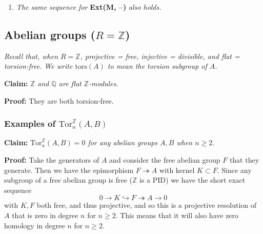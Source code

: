 \documentclass[10pt]{article}
\DeclareMathOperator{\Hom}{Hom}
\begin{document}
\begin{enumerate}
\begin{equation*}
\begin{tikzcd}
{                                              -- (\tikztotarget)}]{u}\\
                            \Hom(A,N) \ar[rounded corners,
                                    to path={ -- ([xshift=-2ex]\tikztostart.west)
                                              -| ([xshift=-2ex]\tikztotarget.west)
                                              -- (\tikztotarget)}]{u}
                            & \Hom(B,N) \lar
                            & \Hom(C,N) \lar
                        \end{tikzcd}
                        \raisebox{-2.25cm}{\hspace{-.4cm}$\xleftarrow{\makebox[1cm]{}}0$}
                    \end{equation*}
                    \item \emph{The same sequence for} \textbf{Ext(M, --)} \emph{also holds.}
            \end{enumerate}
            
        \subsection{Abelian groups ($R=\mathbb{Z}$)}

            \emph{Recall that, when $R=\mathbb{Z}$, projective = free, injective =
            divisible, and flat = torsion-free.} \emph{We write $\mathrm{tors}(A)$
            to mean the torsion subgroup of $A$.}

            \bigskip

            \textbf{Claim:} \emph{$\mathbb{Z}$ and $\mathbb{Q}$ are flat
            $\mathbb{Z}$-modules.}

            \textbf{Proof:} They are both torsion-free.

            \subsubsection{Examples of
                $\mathrm{Tor}_n^\mathbb{Z}(A,B)$}\label{sssec:examples-of-tor-ab}

                \textbf{Claim:} \emph{$\mathrm{Tor}_n^\mathbb{Z}(A,B)=0$ for any
                abelian groups $A,B$ when $n\geqslant2$.}

                \textbf{Proof:} Take the generators of $A$ and consider the free
                abelian group $F$ that they generate. Then we have the epimorphism
                $F\twoheadrightarrow A$ with kernel $K\subset F$. Since any subgroup
                of a free abelian group is free ($\mathbb{Z}$ is a PID) we have the
                short exact sequence \[0\to K\hookrightarrow F\twoheadrightarrow A\to0\]
                with $K,F$ both free, and thus projective, and so this is a projective
                resolution of $A$ that is zero in degree $n$ for $n\geqslant2$.
                This means that it will also have zero homology in degree $n$ for
                $n\geqslant2$.
\end{document}
